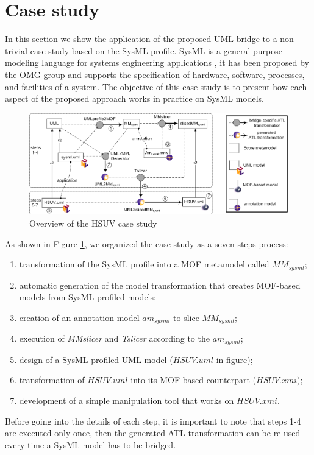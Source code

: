 \section{Case study}\label{sec:caseStudy}
In this section we show the application of the proposed UML bridge to a non-trivial case study based on the SysML profile.
SysML is a general-purpose modeling language for systems engineering applications \cite{sysml}, it has been proposed by the OMG group
and supports the specification of  hardware, software, processes, and facilities of a system.
The objective of this case study is to present how each aspect of the proposed approach works in practice on SysML models.

\begin{figure}[htbp]
	\centering
		\includegraphics[width=1\textwidth]{figures/caseStudy.png}
	\caption{Overview of the HSUV case study}
	\label{fig:caseStudy}
\end{figure}

As shown in Figure \ref{fig:caseStudy}, we organized the case study as a seven-steps process:
%
\begin{enumerate}
	\item transformation of the SysML profile into a MOF metamodel called $MM_{sysml}$;
	\item automatic generation of the model transformation that creates MOF-based models from SysML-profiled models;
	\item creation of an annotation model $am_{sysml}$ to slice $MM_{sysml}$;
	\item execution of \textit{MMslicer} and \textit{Tslicer} according to the $am_{sysml}$;
	\item design of a SysML-profiled UML model ($HSUV.uml$ in figure);
	\item transformation of $HSUV.uml$ into its MOF-based counterpart ($HSUV.xmi$);
	\item development of a simple manipulation tool that works on $HSUV.xmi$.
\end{enumerate}
%
Before going into the details of each step, it is important to note that steps 1-4 are executed only once, 
then the generated ATL transformation can be re-used every time a SysML model has to be bridged.

